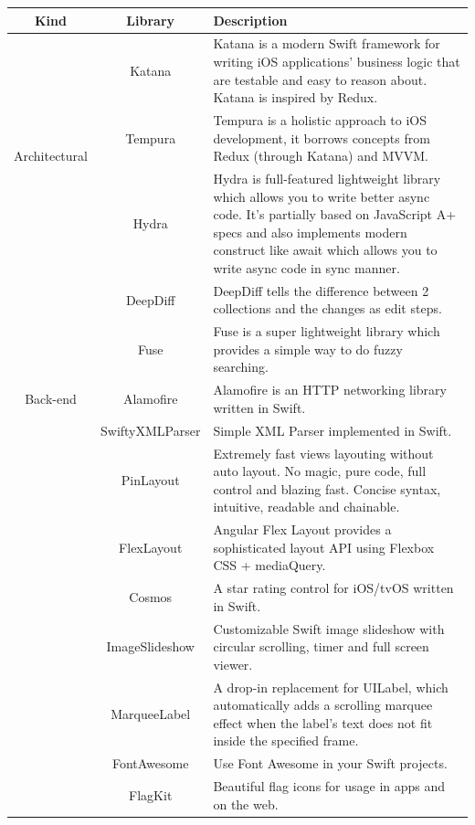 \documentclass[a4paper, 11pt, parskip=half]{scrreprt}
\theoremstyle{definition}
\begin{document}
\begin{table}[h]
    \centering
    \def\arraystretch{1.3}
    \begin{tabular}{|c|c|m{9cm}|}
        \hline
        \textbf{Kind} & \textbf{Library} & \textbf{Description} \\ \hline
        \multirow{3}{*}{Architectural} & Katana & Katana is a modern Swift framework for writing iOS applications' business logic that are testable and easy to reason about. Katana is inspired by Redux. \\ \cline{2-3}
        & Tempura & Tempura is a holistic approach to iOS development, it borrows concepts from Redux (through Katana) and MVVM. \\ \cline{2-3}
        & Hydra & Hydra is full-featured lightweight library which allows you to write better async code. It's partially based on JavaScript A+ specs and also implements modern construct like await which allows you to write async code in sync manner. \\ \hline
        \multirow{5}{*}{Back-end} & DeepDiff & DeepDiff tells the difference between 2 collections and the changes as edit steps. \\ \cline{2-3}
        & Fuse & Fuse is a super lightweight library which provides a simple way to do fuzzy searching. \\ \cline{2-3}
        & Alamofire & Alamofire is an HTTP networking library written in Swift. \\ \cline{2-3}
        & SwiftyXMLParser & Simple XML Parser implemented in Swift. \\ \hline
        \multirow{7}{*}{Front-end} & PinLayout & Extremely fast views layouting without auto layout. No magic, pure code, full control and blazing fast. Concise syntax, intuitive, readable and chainable. \\ \cline{2-3}
        & FlexLayout & Angular Flex Layout provides a sophisticated layout API using Flexbox CSS + mediaQuery. \\ \cline{2-3}
        & Cosmos & A star rating control for iOS/tvOS written in Swift. \\ \cline{2-3}
        & ImageSlideshow & Customizable Swift image slideshow with circular scrolling, timer and full screen viewer. \\ \cline{2-3}
        & MarqueeLabel & A drop-in replacement for UILabel, which automatically adds a scrolling marquee effect when the label's text does not fit inside the specified frame. \\ \cline{2-3}
        & FontAwesome & Use Font Awesome in your Swift projects. \\ \cline{2-3}
        & FlagKit & Beautiful flag icons for usage in apps and on the web. \\ \hline
    \end{tabular}
\end{table}
\end{document}
